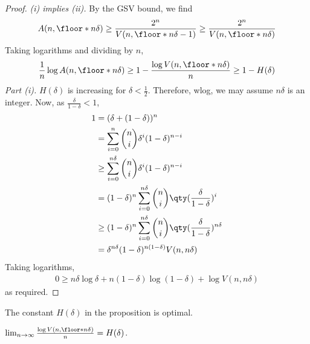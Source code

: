 \begin{proof}
    \emph{(i) implies (ii).}
    By the GSV bound, we find
    \begin{align*}
        A(n,\floor*{n\delta}) \geq \frac{2^n}{V(n,\floor*{n\delta} - 1)} \geq \frac{2^n}{V(n,\floor*{n\delta})}
    \end{align*}
    Taking logarithms and dividing by $n$,
    \begin{align*}
        \frac{1}{n}\log A(n,\floor*{n\delta}) \geq 1 - \frac{\log V(n,\floor*{n\delta})}{n} \geq 1 - H(\delta)
    \end{align*}
    \emph{Part (i).}
    $H(\delta)$ is increasing for $\delta < \frac{1}{2}$.
    Therefore, wlog, we may assume $n\delta$ is an integer.
    Now, as $\frac{\delta}{1-\delta} < 1$,
    \begin{align*}
        1 &= (\delta + (1-\delta))^n \\
        &= \sum_{i=0}^n \binom{n}{i} \delta^i (1-\delta)^{n-i} \\
        &\geq \sum_{i=0}^{n\delta} \binom{n}{i} \delta^i (1-\delta)^{n-i} \\
        &= (1-\delta)^n \sum_{i=0}^{n\delta} \binom{n}{i} \qty(\frac{\delta}{1-\delta})^i \\
        &\geq (1-\delta)^n \sum_{i=0}^{n\delta} \binom{n}{i} \qty(\frac{\delta}{1-\delta})^{n\delta} \\
        &= \delta^{n\delta} (1-\delta)^{n(1-\delta)} V(n,n\delta)
    \end{align*}
    Taking logarithms,
    \begin{align*}
        0 \geq n\delta \log \delta + n(1-\delta) \log(1-\delta) + \log V(n,n\delta)
    \end{align*}
    as required.
\end{proof}

The constant $H(\delta)$ in the proposition is optimal.

\begin{lemma}
    $\lim_{n \to \infty} \frac{\log V(n,\floor*{n\delta})}{n} = H(\delta)$.
\end{lemma}

